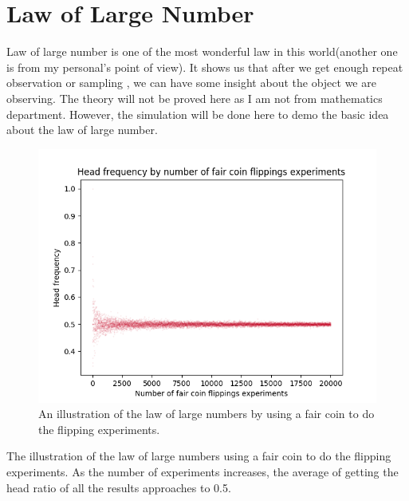 \documentclass[a4paper,12pt]{article}
\begin{document}
\section{Law of Large Number}
Law of large number is one of the most wonderful law in this world(another one is  from my personal's point of view). It shows us that after we get enough repeat observation or sampling , we can have some insight about the object we are observing. The theory will not be proved here as I am not from mathematics department. However, the simulation will be done here to demo the basic idea about the law of large number.\\
\begin{figure}[H]
  \begin{center}
      \includegraphics[scale=0.8]{law_of_large_number.png}
\end{center}
\caption{An illustration of the law of large numbers by using a fair coin to do the flipping experiments.}
 \label {fig:2}
 \end{figure}
The illustration of the law of large numbers using a fair coin to do the flipping experiments. As the number of experiments increases, the average of getting the head ratio of all the results approaches to 0.5.\\
\end{document}
